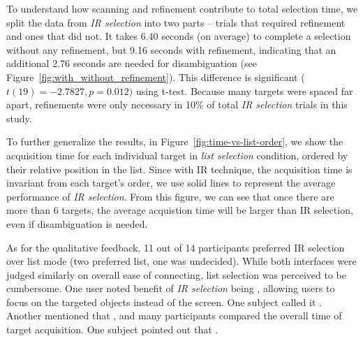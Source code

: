 To understand how scanning and refinement contribute to total selection time, we split the data from {\em IR selection} into two parts -- trials that required refinement and ones that did not. It takes 6.40 seconds (on average) to complete  a selection without any refinement, but 9.16 seconds with refinement, indicating that an additional 2.76 seconds are needed for disambiguation (see Figure~\ref{fig:with_without_refinement}). This difference is significant ($t(19)=-2.7827, p=0.012)$ using t-test.
Because many targets were spaced far apart, refinements were only necessary in 10\% of total {\em IR selection} trials in this study.

To further generalize the results, in Figure~\ref{fig:time-vs-list-order}, we show the acquisition time for each individual target in {\em list selection} condition, ordered by their relative position in the list. Since with IR technique, the acquisition time is invariant from each target's order, we use solid lines to represent the average performance of {\em IR selection}. From this figure, we can see that once there are more than 6 targets, the average acquistion time will be larger than IR selection, even if disambiguation is needed. %

As for the qualitative feedback, 11 out of 14 participants preferred IR selection over list mode (two preferred list, one was undecided). While both interfaces were judged similarly on overall ease of connecting, list selection was perceived to be cumbersome. One user noted benefit of {\em IR selection} being , allowing users to focus on the targeted objects instead of the screen. One subject called it . Another mentioned that , and many participants compared the overall time of target acquisition. One subject pointed out that .

